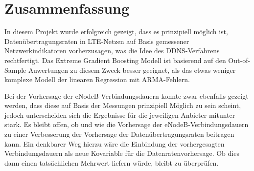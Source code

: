 \section{Zusammenfassung}

In diesem Projekt wurde erfolgreich gezeigt, dass es prinzipiell m\"oglich ist, Daten\"ubertragungsraten in LTE-Netzen
auf Basis gemessener Netzwerkindikatoren vorherzusagen, was die Idee des DDNS-Verfahrens rechtfertigt.
Das Extreme Gradient Boosting Modell ist basierend auf den Out-of-Sample Auwertungen zu diesem Zweck besser geeignet,
als das etwas weniger komplexe Modell der linearen Regression mit ARMA-Fehlern.

Bei der Vorhersage der eNodeB-Verbindungsdauern konnte zwar ebenfalls gezeigt werden, dass diese auf Basis der Messungen
prinzipiell M\"oglich zu sein scheint, jedoch unterscheiden sich die Ergebnisse f\"ur die jeweiligen Anbieter mitunter stark.
Es bleibt offen, ob und wie die Vorhersage der eNodeB-Verbindungsdauern zu einer Verbesserung der Vorhersage der
Daten\"ubertragungsraten beitragen kann. Ein denkbarer Weg hierzu w\"are die Einbindung der vorhergesagten Verbindungsdauern
als neue Kovariable f\"ur die Datenratenvorhersage. Ob dies dann einen tats\"achlichen Mehrwert liefern w\"urde, bleibt zu \"uberpr\"ufen.
